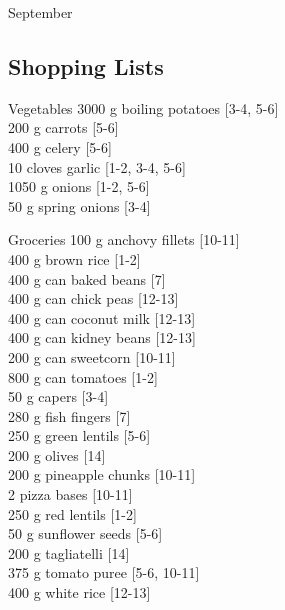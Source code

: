 \begin{menu}{September}
    \subsection*{Shopping Lists}
      \begin{shoppinglist}{Vegetables}
      3000 g boiling potatoes {\scriptsize[3-4, 5-6]}\\
      200 g carrots {\scriptsize[5-6]}\\
      400 g celery {\scriptsize[5-6]}\\
      10 cloves garlic {\scriptsize[1-2, 3-4, 5-6]}\\
      1050 g onions {\scriptsize[1-2, 5-6]}\\
      50 g spring onions {\scriptsize[3-4]}\\
      \end{shoppinglist}%
      \begin{shoppinglist}{Groceries}
      100 g anchovy fillets {\scriptsize[10-11]}\\
      400 g brown rice {\scriptsize[1-2]}\\
      400 g can baked beans {\scriptsize[7]}\\
      400 g can chick peas {\scriptsize[12-13]}\\
      400 g can coconut milk {\scriptsize[12-13]}\\
      400 g can kidney beans {\scriptsize[12-13]}\\
      200 g can sweetcorn {\scriptsize[10-11]}\\
      800 g can tomatoes {\scriptsize[1-2]}\\
      50 g capers {\scriptsize[3-4]}\\
      280 g fish fingers {\scriptsize[7]}\\
      250 g green lentils {\scriptsize[5-6]}\\
      200 g olives {\scriptsize[14]}\\
      200 g pineapple chunks {\scriptsize[10-11]}\\
      2  pizza bases {\scriptsize[10-11]}\\
      250 g red lentils {\scriptsize[1-2]}\\
      50 g sunflower seeds {\scriptsize[5-6]}\\
      200 g tagliatelli {\scriptsize[14]}\\
      375 g tomato puree {\scriptsize[5-6, 10-11]}\\
      400 g white rice {\scriptsize[12-13]}\\

\end{shoppinglist}
\end{menu}
